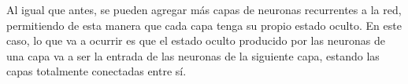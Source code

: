 \documentclass[../../main.tex]{subfiles}
\begin{document}

Al igual que antes, se pueden agregar más capas de neuronas recurrentes a la red,
permitiendo de esta manera que cada capa tenga su propio estado oculto. En este caso, lo
que va a ocurrir es que el estado oculto producido por las neuronas de una capa va a ser
la entrada de las neuronas de la siguiente capa, estando las capas totalmente conectadas
entre sí.
\end{document}

